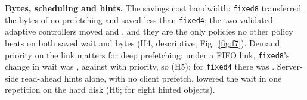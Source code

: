 \textbf{Bytes, scheduling and hints.} The savings cost bandwidth:
\texttt{fixed8} transferred \liveBytesXHddFixedEight{} the bytes of no
prefetching and saved less than \texttt{fixed4}; the two validated adaptive
controllers moved \liveBytesXHddAdaptiveZeroPointZeroOne{} and
\liveBytesXHddAdaptiveZeroPointOneAtTransOnline, and they are the only policies
no other policy beats on both saved wait and bytes (H4, descriptive;
Fig.~\ref{fig:f7}). Demand priority on the link matters for deep prefetching:
under a FIFO link, \texttt{fixed8}'s change in wait was
\decLiveHFiveSsdFixedEightFIFOCI, against \decLiveHFiveSsdFixedEightPriorityRepOneCI{}
with priority, so \decLiveHFiveSsdFixedEightVerdict{} (H5); for \texttt{fixed4}
there was \decLiveHFiveSsdFixedFourVerdict. Server-side read-ahead hints alone,
with no client prefetch, lowered the wait in one repetition on the hard disk
(H6; \decLiveHSixHddHintFixedEightCI{} for eight hinted objects).
